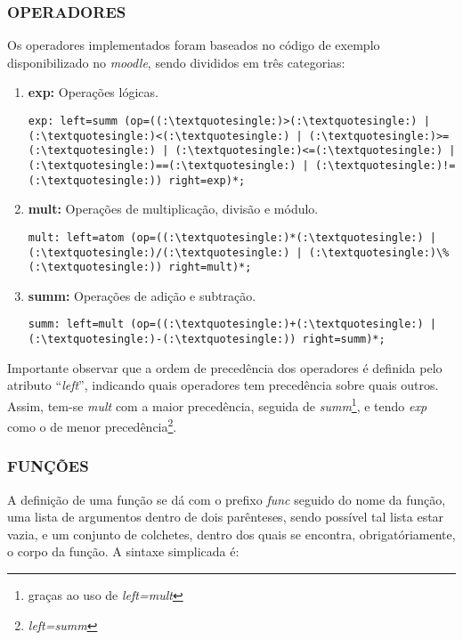         \subsubsection{\normalsize OPERADORES}
            Os operadores implementados foram baseados no código de exemplo disponibilizado no \textit{moodle}, sendo divididos em três categorias:
            \begin{enumerate}
                \item \textbf{exp:} Operações lógicas.
                    \begin{lstlisting}
exp: left=summ (op=((:\textquotesingle:)>(:\textquotesingle:) | (:\textquotesingle:)<(:\textquotesingle:) | (:\textquotesingle:)>=(:\textquotesingle:) | (:\textquotesingle:)<=(:\textquotesingle:) | (:\textquotesingle:)==(:\textquotesingle:) | (:\textquotesingle:)!=(:\textquotesingle:)) right=exp)*;
                    \end{lstlisting}

                \item \textbf{mult:} Operações de multiplicação, divisão e módulo.
                    \begin{lstlisting}
mult: left=atom (op=((:\textquotesingle:)*(:\textquotesingle:) | (:\textquotesingle:)/(:\textquotesingle:) | (:\textquotesingle:)\%(:\textquotesingle:)) right=mult)*;
                    \end{lstlisting}

                \item \textbf{summ:} Operações de adição e subtração.
                    \begin{lstlisting}
summ: left=mult (op=((:\textquotesingle:)+(:\textquotesingle:) | (:\textquotesingle:)-(:\textquotesingle:)) right=summ)*;
                    \end{lstlisting}
            \end{enumerate}

            Importante observar que a ordem de precedência dos operadores é definida pelo atributo ``\textit{left}'', indicando quais operadores tem precedência sobre quais outros. Assim, tem-se \textit{mult} com a maior precedência, seguida de \textit{summ}\footnote{graças ao uso de \textit{left=mult}}, e tendo \textit{exp} como o de menor precedência\footnote{\textit{left=summ}}.

        \subsubsection{\normalsize FUNÇÕES}
            A definição de uma função se dá com o prefixo \textit{func} seguido do nome da função, uma lista de argumentos dentro de dois parênteses, sendo possível tal lista estar vazia, e um conjunto de colchetes, dentro dos quais se encontra, obrigatóriamente, o corpo da função. A sintaxe simplicada é:

